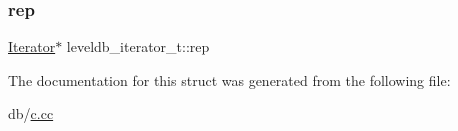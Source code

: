 \subsubsection{\texorpdfstring{rep}{rep}}
{\footnotesize\ttfamily \mbox{\hyperlink{classleveldb_1_1_iterator}{Iterator}}$\ast$ leveldb\+\_\+iterator\+\_\+t\+::rep}



The documentation for this struct was generated from the following file\+:\begin{DoxyCompactItemize}
\item 
db/\mbox{\hyperlink{c_8cc}{c.\+cc}}\end{DoxyCompactItemize}
